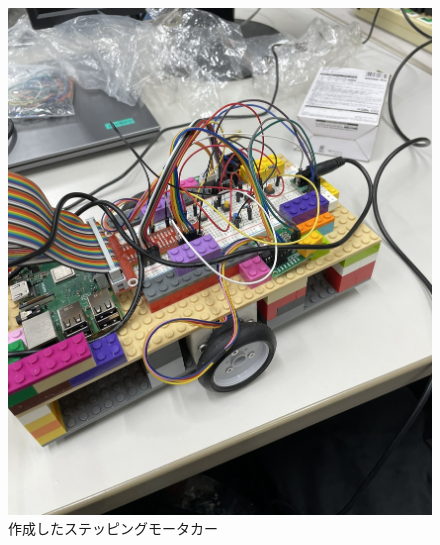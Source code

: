 \documentclass{ltjsarticle} %
\begin{document}
\begin{figure}[H] %
  \centering
  \begin{minipage}{0.45\textwidth} %
    \centering
    \includegraphics[width=\textwidth]{raspi3.JPEG} %
    \caption{作成したステッピングモータカー} %
    \label{fig:raspi3} %
  \end{minipage}
  \hfill %
  \begin{minipage}{0.45\textwidth} %
    \centering

\end{minipage}
\end{figure}
\end{document}
